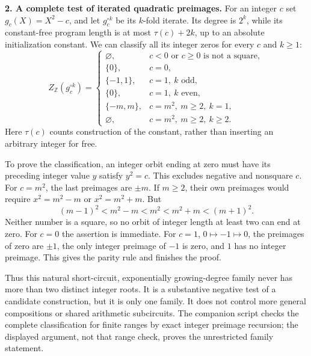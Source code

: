 \documentclass[11pt,a4paper]{article}
\newcommand{\Z}{\mathbb{Z}}
\numberwithin{equation}{section}
\begin{document}
\textbf{2. A complete test of iterated quadratic preimages.}
For an integer $c$ set $g_c(X)=X^2-c$, and let $g_c^{\circ k}$ be its
$k$-fold iterate. Its degree is $2^k$, while its constant-free program
length is at most $\tau(c)+2k$, up to an absolute initialization constant.
We can classify all its integer zeros for every $c$ and $k\ge1$:
\begin{equation}\label{statement:iterate}
 Z_{\Z}(g_c^{\circ k})=
 \begin{cases}
 \varnothing,&c<0\text{ or }c\ge0\text{ is not a square},\\
 \{0\},&c=0,\\
 \{-1,1\},&c=1,\ k\text{ odd},\\
 \{0\},&c=1,\ k\text{ even},\\
 \{-m,m\},&c=m^2,\ m\ge2,\ k=1,\\
 \varnothing,&c=m^2,\ m\ge2,\ k\ge2.
 \end{cases}
\end{equation}
Here $\tau(c)$ counts construction of the constant, rather than inserting
an arbitrary integer for free.

To prove the classification, an integer orbit ending at zero must have
its preceding integer value $y$ satisfy $y^2=c$. This excludes negative
and nonsquare $c$. For $c=m^2$, the last preimages are $\pm m$.
If $m\ge2$, their own preimages would require
$x^2=m^2-m$ or $x^2=m^2+m$. But
\[
 (m-1)^2<m^2-m<m^2<m^2+m<(m+1)^2.
\]
Neither number is a square, so no orbit of integer length at least two
can end at zero. For $c=0$ the assertion is immediate. For $c=1$,
$0\mapsto-1\mapsto0$, the preimages of zero are $\pm1$, the only
integer preimage of $-1$ is zero, and $1$ has no integer preimage.
This gives the parity rule and finishes the proof.

Thus this natural short-circuit, exponentially growing-degree family
never has more than two distinct integer roots. It is a substantive
negative test of a candidate construction, but it is only one family.
It does not control more general compositions or shared arithmetic
subcircuits. The companion script checks the complete classification
for finite ranges by exact integer preimage recursion; the displayed
argument, not that range check, proves the unrestricted family statement.
\end{document}
